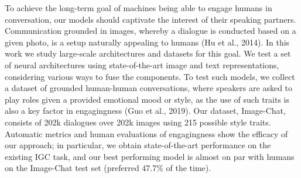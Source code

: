 To achieve the long-term goal of machines being able to engage humans in conversation, our models should captivate the interest of their speaking partners. Communication grounded in images, whereby a dialogue is conducted based on a given photo, is a setup naturally appealing to humans (Hu et al., 2014). In this work we study large-scale architectures and datasets for this goal. We test a set of neural architectures using state-of-the-art image and text representations, considering various ways to fuse the components. To test such models, we collect a dataset of grounded human-human conversations, where speakers are asked to play roles given a provided emotional mood or style, as the use of such traits is also a key factor in engagingness (Guo et al., 2019). Our dataset, Image-Chat, consists of 202k dialogues over 202k images using 215 possible style traits. Automatic metrics and human evaluations of engagingness show the efficacy of our approach; in particular, we obtain state-of-the-art performance on the existing IGC task, and our best performing model is almost on par with humans on the Image-Chat test set (preferred 47.7\% of the time).
